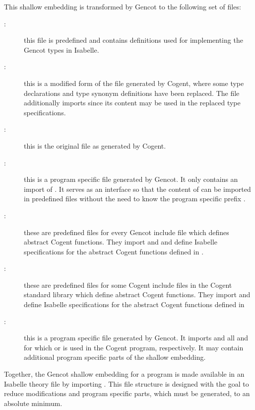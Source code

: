 This shallow embedding is transformed by Gencot to the following set of files:
\begin{description}
\item[:] this file is predefined and contains definitions used for implementing the Gencot 
types in Isabelle.
\item[:] this is a modified form of the file generated by Cogent, where some type 
declarations and type synonym definitions have been replaced. The file additionally imports 
since its content may be used in the replaced type specifications.
\item[:] this is the original file as generated by Cogent.
\item[:] this is a program specific file generated by Gencot. It only contains an import of 
. It serves as an interface so that the content of  can be
imported in predefined files without the need to know the program specific prefix .
\item[:] these are predefined files for every Gencot include file  which defines
abstract Cogent functions. They import  and  and define Isabelle
specifications for the abstract Cogent functions defined in .
\item[:] these are predefined files for some Cogent include files  in the 
Cogent standard library  which define abstract Cogent functions. They import 
and define Isabelle specifications for the abstract Cogent functions defined in 
\item[:] this is a program specific file generated by Gencot. It imports 
 and all  and  for which 
or  is used in the Cogent program, respectively. It may contain additional program specific parts
of the shallow embedding. 
\end{description}

Together, the Gencot shallow embedding for a program  is made available in an Isabelle theory file by importing
. This file structure is designed with the goal to reduce modifications and program 
specific parts, which must be generated, to an absolute minimum.

